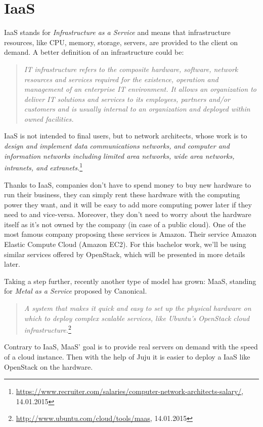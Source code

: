 \section{IaaS}
IaaS stands for \textit{Infrastructure as a Service} and means that infrastructure resources, like CPU, memory, storage, servers, are provided to the client on demand. A better definition of an infrastructure could be:
\begin{quotation}
\textit{
IT infrastructure refers to the composite hardware, software, network resources and services required for the existence, operation and management of an enterprise IT environment. It allows an organization to deliver IT solutions and services to its employees, partners and/or customers and is usually internal to an organization and deployed within owned facilities.
}\cite{cjanssen14}
\end{quotation}

IaaS is not intended to final users, but to network architects, whose work is to 
\textit{design and implement data communications networks, and computer and information networks including limited area networks, wide area networks, intranets, and extranets.}\footnote{\url{https://www.recruiter.com/salaries/computer-network-architects-salary/}, 14.01.2015}

Thanks to IaaS, companies don't have to spend money to buy new hardware to run their business, they can simply rent these hardware with the computing power they want, and it will be easy to add more computing power later if they need to and vice-versa. 
Moreover, they don't need to worry about the hardware itself as it's not owned by the company (in case of a public cloud). 
One of the most famous company proposing these services is Amazon. 
Their service Amazon Elastic Compute Cloud (Amazon EC2). 
For this bachelor work, we'll be using similar services offered by OpenStack, which will be presented in more details later.

Taking a step further, recently another type of model has grown: MaaS, standing for \textit{Metal as a Service} proposed by Canonical. 

\begin{quotation}
\textit{A system that makes it quick and easy to set up the physical hardware on which to deploy complex scalable services, like Ubuntu’s OpenStack cloud infrastructure.}\footnote{\url{http://www.ubuntu.com/cloud/tools/maas}, 14.01.2015}
\end{quotation}

Contrary to IaaS, MaaS' goal is to provide real servers on demand with the speed of a cloud instance. Then with the help of Juju it is easier to deploy a IaaS like OpenStack on the hardware.







